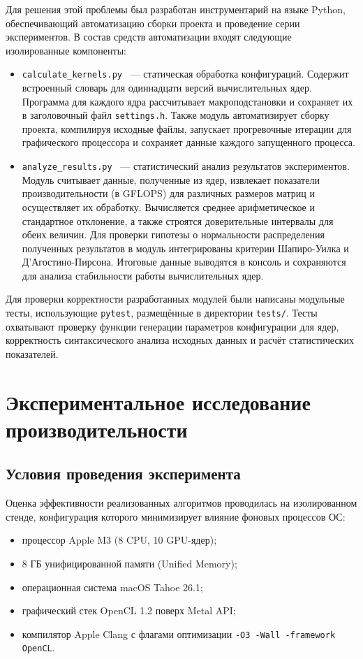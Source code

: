 \documentclass[a4paper]{article}
\begin{document}
Для решения этой проблемы был разработан инструментарий на языке Python, обеспечивающий автоматизацию сборки проекта и проведение серии экспериментов. В состав средств автоматизации входят следующие изолированные компоненты:
\begin{itemize}[noitemsep, topsep=0pt]
    \item \texttt{calculate\_kernels.py} ~--- статическая обработка конфигураций. Содержит встроенный словарь для одиннадцати версий вычислительных ядер. Программа для каждого ядра рассчитывает макроподстановки и сохраняет их в заголовочный файл \texttt{settings.h}. Также модуль автоматизирует сборку проекта, компилируя исходные файлы, запускает прогревочные итерации для графического процессора и сохраняет данные каждого запущенного процесса.
    \item \texttt{analyze\_results.py} ~--- статистический анализ результатов экспериментов. Модуль считывает данные, полученные из ядер, извлекает показатели производительности (в GFLOPS) для различных размеров матриц и осуществляет их обработку. Вычисляется среднее арифметическое и стандартное отклонение, а также строятся доверительные интервалы для обеих величин. Для проверки гипотезы о нормальности распределения полученных результатов в модуль интегрированы критерии Шапиро-Уилка и Д'Агостино-Пирсона. Итоговые данные выводятся в консоль и сохраняются для анализа стабильности работы вычислительных ядер.
\end{itemize}

Для проверки корректности разработанных модулей были написаны модульные тесты, использующие \texttt{pytest}, размещённые в директории \texttt{tests/}. Тесты охватывают проверку функции генерации параметров конфигурации для ядер, корректность синтаксического анализа исходных данных и расчёт статистических показателей.

\section{Экспериментальное исследование производительности}

\subsection{Условия проведения эксперимента}

Оценка эффективности реализованных алгоритмов проводилась на изолированном стенде, конфигурация которого минимизирует влияние фоновых процессов ОС:
\begin{itemize}
    \item процессор Apple M3 (8 CPU, 10 GPU-ядер);
    \item 8 ГБ унифицированной памяти (Unified Memory);
    \item операционная система macOS Tahoe 26.1;
    \item графический стек OpenCL 1.2 поверх Metal API;
    \item компилятор Apple Clang с флагами оптимизации \texttt{-O3 -Wall -framework OpenCL}.
\end{itemize}
\end{document}
